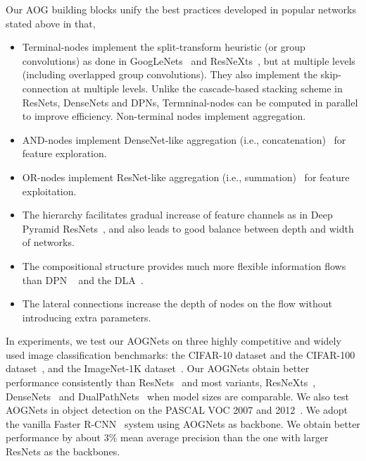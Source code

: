 \documentclass[10pt,twocolumn,letterpaper]{article}
\begin{document}
Our AOG building blocks unify the best practices developed in popular networks stated above in that,
\begin{itemize}[leftmargin=*]
 \itemsep0em
    \item Terminal-nodes implement the split-transform heuristic (or group convolutions) as done in GoogLeNets~\cite{InceptionNet} and ResNeXts~\cite{ResNeXt}, but at multiple levels (including overlapped group convolutions). They also implement the skip-connection at multiple levels. Unlike the cascade-based stacking scheme in ResNets, DenseNets and DPNs, Termninal-nodes can be computed in parallel to improve efficiency. Non-terminal nodes implement aggregation. 
    \item AND-nodes implement DenseNet-like aggregation (i.e., concatenation)~\cite{DenseNet} for feature exploration. 
    \item OR-nodes implement ResNet-like aggregation (i.e., summation)~\cite{ResidualNet} for feature exploitation.
    \item The hierarchy facilitates gradual increase of feature channels as in Deep Pyramid ResNets~\cite{DPRN}, and also leads to good balance between depth and width of networks. 
    \item The compositional structure provides much more flexible information flows than DPN ~\cite{DPN} and the DLA~\cite{DLA}.
    \item The lateral connections increase the depth of nodes on the flow without introducing extra parameters. 
\end{itemize}



 

In experiments, we test our AOGNets on three highly competitive and widely used image classification  benchmarks: the CIFAR-10 dataset and the CIFAR-100 dataset~\cite{CIFAR},  and the ImageNet-1K dataset~\cite{ImageNet}. Our AOGNets obtain better performance consistently than  ResNets~\cite{ResidualNet} and most variants, ResNeXts~\cite{ResNeXt}, DenseNets~\cite{DenseNet} and DualPathNets~\cite{DPN} when model sizes are comparable. We also test AOGNets in object detection on the PASCAL VOC 2007 and 2012~\cite{VOC}. We adopt the vanilla Faster R-CNN~\cite{FasterRCNN} system using AOGNets as backbone. We obtain better performance by about $3\%$ mean average precision than the one with larger ResNets as the backbones. %
\end{document}
